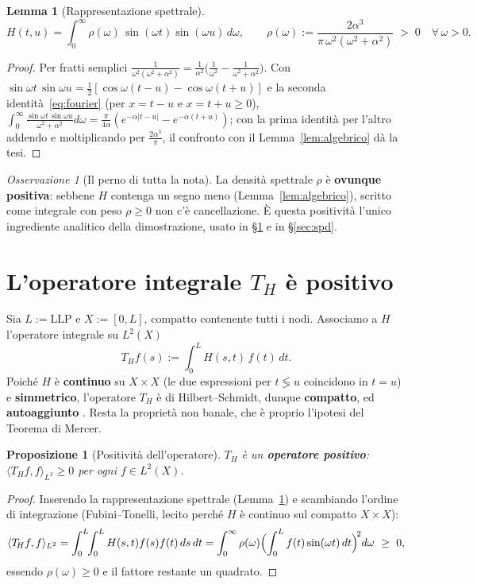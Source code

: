 \documentclass[11pt,a4paper]{article}
\theoremstyle{plain}
\newtheorem{proposizione}[teorema]{Proposizione}
\newtheorem{lemma}[teorema]{Lemma}
\theoremstyle{remark}
\newtheorem*{osservazione}{Osservazione}
\newcommand{\LLP}{\mathrm{LLP}}
\newcommand{\Top}{T_{\!H}}
\newcommand{\inner}[2]{\langle #1, #2\rangle}
\begin{document}
\begin{lemma}[Rappresentazione spettrale]
\label{lem:spettrale}
\[
  H(t,u) = \int_0^\infty \rho(\omega)\,\sin(\omega t)\sin(\omega u)\,d\omega,
  \qquad
  \rho(\omega):=\frac{2\alpha^3}{\pi\,\omega^2(\omega^2+\alpha^2)}\;>\;0\quad\forall\,\omega>0.
\]
\end{lemma}
\begin{proof}
Per fratti semplici $\tfrac{1}{\omega^2(\omega^2+\alpha^2)}=\tfrac1{\alpha^2}\bigl(\tfrac1{\omega^2}
-\tfrac1{\omega^2+\alpha^2}\bigr)$. Con $\sin\omega t\,\sin\omega u=\tfrac12[\cos\omega(t-u)-\cos\omega(t+u)]$
e la seconda identit\`a~\eqref{eq:fourier} (per $x=t-u$ e $x=t+u\ge0$),
$\int_0^\infty\tfrac{\sin\omega t\,\sin\omega u}{\omega^2+\alpha^2}d\omega=\tfrac{\pi}{4\alpha}
(e^{-\alpha|t-u|}-e^{-\alpha(t+u)})$; con la prima identit\`a per l'altro addendo e moltiplicando
per $\tfrac{2\alpha^3}{\pi}$, il confronto con il Lemma~\ref{lem:algebrico} d\`a la tesi.
\end{proof}

\begin{osservazione}[Il perno di tutta la nota]
La densit\`a spettrale $\rho$ \`e \textbf{ovunque positiva}: sebbene $H$ contenga un segno meno
(Lemma~\ref{lem:algebrico}), scritto come integrale con peso $\rho\ge0$ non c'\`e cancellazione.
\`E questa positivit\`a l'unico ingrediente analitico della dimostrazione, usato in
§\ref{sec:operatore} e in §\ref{sec:spd}.
\end{osservazione}

\section{L'operatore integrale \texorpdfstring{$\Top$}{T\_H} \`e positivo}
\label{sec:operatore}

Sia $L:=\LLP$ e $X:=[0,L]$, compatto contenente tutti i nodi. Associamo a $H$ l'operatore
integrale su $L^2(X)$
\[
  \Top f(s):=\int_0^L H(s,t)\,f(t)\,dt .
\]
Poich\'e $H$ \`e \textbf{continuo} su $X\times X$ (le due espressioni per $t\lessgtr u$ coincidono
in $t=u$) e \textbf{simmetrico}, l'operatore $\Top$ \`e di Hilbert--Schmidt, dunque
\textbf{compatto}, ed \textbf{autoaggiunto} \cite{reedsimon1980,brezis2011}. Resta la propriet\`a
non banale, che \`e proprio l'ipotesi del Teorema di Mercer.

\begin{proposizione}[Positivit\`a dell'operatore]
\label{prop:positivo}
$\Top$ \`e un \textbf{operatore positivo}: $\inner{\Top f}{f}_{L^2}\ge0$ per ogni $f\in L^2(X)$.
\end{proposizione}
\begin{proof}
Inserendo la rappresentazione spettrale (Lemma~\ref{lem:spettrale}) e scambiando l'ordine di
integrazione (Fubini--Tonelli, lecito perch\'e $H$ \`e continuo sul compatto $X\times X$):
\[
  \inner{\Top f}{f}_{L^2}
  = \int_0^L\!\!\int_0^L H(s,t)f(s)f(t)\,ds\,dt
  = \int_0^\infty \rho(\omega)\Bigl(\int_0^L f(t)\sin(\omega t)\,dt\Bigr)^{\!2} d\omega\ \ge\ 0,
\]
essendo $\rho(\omega)\ge0$ e il fattore restante un quadrato.
\end{proof}
\end{document}
